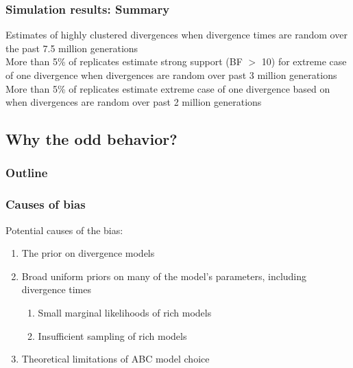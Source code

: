 \begin{frame}
    \frametitle{Simulation results: Summary}
    Estimates of highly clustered divergences when divergence times are random
    over the past 7.5 million generations \\
    \bigskip
    More than 5\% of replicates estimate strong support (BF $>$ 10) for
    extreme case of one divergence when divergences are random over past 3
    million generations \\
    \bigskip
    More than 5\% of replicates estimate extreme case of one divergence based
    on \vmratio{} when divergences are random over past 2 million generations
\end{frame}

\subsection{Why the odd behavior?}

\begin{frame}
\frametitle{Outline}
\end{frame}

\begin{frame}
    \frametitle{Causes of bias}
    Potential causes of the bias:
    \begin{enumerate}
        \item The prior on divergence models
        \item Broad uniform priors on many of the model's parameters, including
            divergence times
            \begin{enumerate}
                \item Small marginal likelihoods of rich models
                \item Insufficient sampling of rich models
            \end{enumerate}
        \item Theoretical limitations of ABC model choice
    \end{enumerate}
\end{frame}

